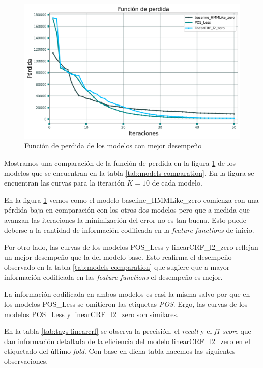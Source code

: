 \documentclass[letterpaper,12pt,oneside]{book}
\theoremstyle{definition}
\begin{document}
\begin{figure}[ht]
	\centering
	\includegraphics[width=\textwidth]{img/loss_models.png}
	\caption{Función de perdida de los modelos con mejor desempeño}
	\label{fig:loss_models}
\end{figure}

Mostramos una comparación de la función de perdida en la figura \ref{fig:loss_models} de los modelos que se encuentran en la tabla \ref{tab:models-comparation}. En la figura se encuentran las curvas para la iteración $K = 10$ de cada modelo.

En la figura \ref{fig:loss_models} vemos como el modelo \textsf{baseline\_HMMLike\_zero} comienza con una pérdida baja en comparación con los otros dos modelos pero que a medida que avanzan las iteraciones la minimización del error no es tan buena. Esto puede deberse a la cantidad de información codificada en la \textit{feature functions} de inicio.

Por otro lado, las curvas de los modelos \textsf{POS\_Less} y \textsf{linearCRF\_l2\_zero} reflejan un mejor desempeño que la del modelo base. Esto reafirma el desempeño observado en la tabla \ref{tab:models-comparation} que sugiere que a mayor información codificada en las \textit{feature functions} el desempeño es mejor.

La información codificada en ambos modelos es casi la misma salvo por que en los modelos \textsf{POS\_Less} se omitieron las etiquetas \textit{POS}. Ergo, las curvas de los modelos \textsf{POS\_Less} y \textsf{linearCRF\_l2\_zero} son  similares.

En la tabla \ref{tab:tags-linearcrf} se observa la precisión, el \textit{recall} y el \textit{f1-score} que dan información detallada de la eficiencia del modelo \textsf{linearCRF\_l2\_zero} en el etiquetado del último \textit{fold}. Con base en dicha tabla hacemos las siguientes observaciones.
\end{document}
